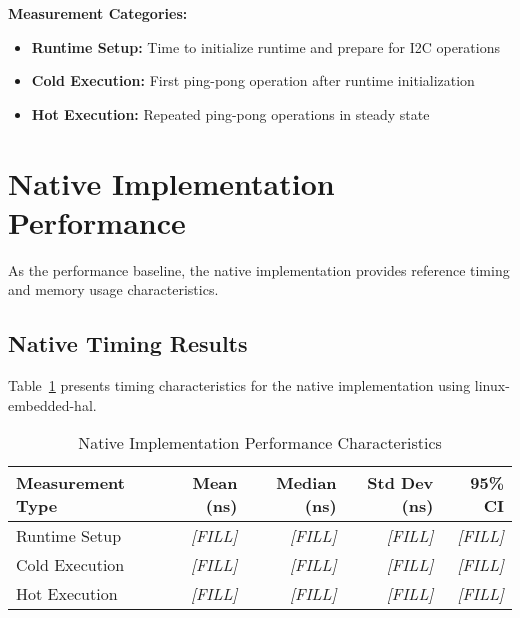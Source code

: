 \textbf{Measurement Categories:}
\begin{itemize}
    \item \textbf{Runtime Setup:} Time to initialize runtime and prepare for I2C operations
    \item \textbf{Cold Execution:} First ping-pong operation after runtime initialization
    \item \textbf{Hot Execution:} Repeated ping-pong operations in steady state
\end{itemize}

\section{Native Implementation Performance}
\label{sec:native-performance}

As the performance baseline, the native implementation provides reference timing and memory usage characteristics.

\subsection{Native Timing Results}
\label{subsec:native-timing}

Table~\ref{tab:native-performance} presents timing characteristics for the native implementation using linux-embedded-hal.

\begin{table}[htbp]
\centering
\caption{Native Implementation Performance Characteristics}
\label{tab:native-performance}
\begin{tabular}{lrrrr}
\toprule
\textbf{Measurement Type} & \textbf{Mean (ns)} & \textbf{Median (ns)} & \textbf{Std Dev (ns)} & \textbf{95\% CI} \\
\midrule
Runtime Setup    & \textit{[FILL]} & \textit{[FILL]} & \textit{[FILL]} & \textit{[FILL]} \\
Cold Execution   & \textit{[FILL]} & \textit{[FILL]} & \textit{[FILL]} & \textit{[FILL]} \\
Hot Execution    & \textit{[FILL]} & \textit{[FILL]} & \textit{[FILL]} & \textit{[FILL]} \\
\bottomrule
\end{tabular}
\end{table}


